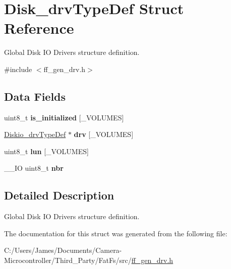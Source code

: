 \hypertarget{struct_disk__drv_type_def}{}\section{Disk\+\_\+drv\+Type\+Def Struct Reference}
\label{struct_disk__drv_type_def}


Global Disk IO Drivers structure definition.  




{\ttfamily \#include $<$ff\+\_\+gen\+\_\+drv.\+h$>$}

\subsection*{Data Fields}
\begin{DoxyCompactItemize}
\item 
\mbox{\label{struct_disk__drv_type_def_af10ea7fab61b9380029a30180c0e7b51}} 
uint8\+\_\+t {\bfseries is\+\_\+initialized} \mbox{[}\+\_\+\+V\+O\+L\+U\+M\+ES\mbox{]}
\item 
\mbox{\label{struct_disk__drv_type_def_a102c166f9ee4f525602f2c6d34cf151a}} 
\hyperlink{struct_diskio__drv_type_def}{Diskio\+\_\+drv\+Type\+Def} $\ast$ {\bfseries drv} \mbox{[}\+\_\+\+V\+O\+L\+U\+M\+ES\mbox{]}
\item 
\mbox{\label{struct_disk__drv_type_def_a1f6d526bcfd3020e26f75ed743b75e78}} 
uint8\+\_\+t {\bfseries lun} \mbox{[}\+\_\+\+V\+O\+L\+U\+M\+ES\mbox{]}
\item 
\mbox{\label{struct_disk__drv_type_def_aa8c9dfecd9e44db791c8099e8ce2ceb1}} 
\+\_\+\+\_\+\+IO uint8\+\_\+t {\bfseries nbr}
\end{DoxyCompactItemize}


\subsection{Detailed Description}
Global Disk IO Drivers structure definition. 

The documentation for this struct was generated from the following file\+:\begin{DoxyCompactItemize}
\item 
C\+:/\+Users/\+James/\+Documents/\+Camera-\/\+Microcontroller/\+Third\+\_\+\+Party/\+Fat\+Fs/src/\hyperlink{ff__gen__drv_8h}{ff\+\_\+gen\+\_\+drv.\+h}\end{DoxyCompactItemize}

